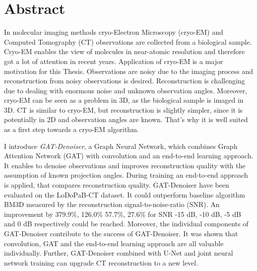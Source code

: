\chapter{Abstract}


In molecular imaging methods cryo-Electron Microscopy (cryo-EM) and Computed Tomography (CT)
observations are collected from a biological sample. 
Cryo-EM enables the view of molecules in near-atomic resolution and therefore got a lot of attention in recent years.
Application of cryo-EM is a major motivation for this Thesis. 
Observations are noisy due to the imaging process and reconstruction from noisy observations is desired.
Reconstruction is challenging due to dealing with enormous noise and unknown observation angles.
Moreover, cryo-EM can be seen as a problem in 3D, as the biological sample is imaged in 3D.
CT is similar to cryo-EM, but reconstruction is slightly simpler, since it is potentially in 2D and 
observation angles are known.
That's why it is well suited as a first step towards a cryo-EM algorithm.

I introduce \textit{GAT-Denoiser}, a Graph Neural Network, which combines Graph Attention Network (GAT) with convolution 
and an end-to-end learning approach. 
It enables to denoise observations and improves reconstruction quality with the assumption of known projection angles.
During training an end-to-end approach is applied, that compares reconstruction quality.
GAT-Denoiser have been evaluated on the LoDoPaB-CT dataset.
It could outperform baseline algorithm BM3D measured by the reconstruction
signal-to-noise-ratio (SNR). An improvement by 379.9\%, 126.0\% 57.7\%, 27.6\% for SNR -15 dB, -10 dB, -5 dB and 0 dB respectively
could be reached.
Moreover, the individual components of GAT-Denoiser contribute to the success of GAT-Denoiser.
It was shown that convolution, GAT and the end-to-end learning approach are all valuable individually.
Further, GAT-Denoiser combined with U-Net and joint neural network training can upgrade CT reconstruction to a new level. 


